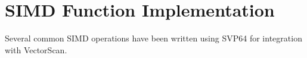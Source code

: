 %
\chapter{SIMD Function Implementation}

Several common SIMD operations have been written using SVP64 for integration
with VectorScan.


